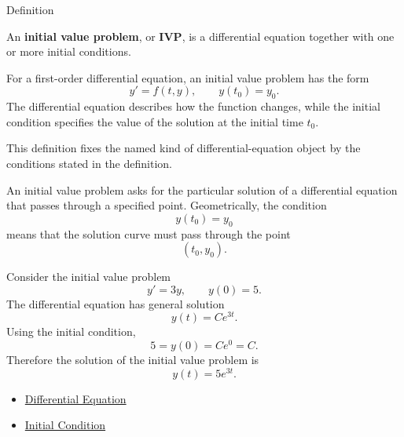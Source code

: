 \begin{definitionbox}{Definition}
\begin{definition}
\label{def:ordinary-differential-equations-solutions-initial-value-problem}
An \textbf{initial value problem}, or \textbf{IVP}, is a differential equation together with one or more initial conditions.

For a first-order differential equation, an initial value problem has the form
\[
y'=f(t,y),
\qquad
y(t_0)=y_0.
\]
The differential equation describes how the function changes, while the initial condition specifies the value of the solution at the initial time $t_0$.
\end{definition}
\end{definitionbox}

\begin{remark*}
This definition fixes the named kind of differential-equation object by the
conditions stated in the definition.
\end{remark*}

\begin{remark*}[Interpretation]
An initial value problem asks for the particular solution of a differential equation that passes through a specified point. Geometrically, the condition
\[
y(t_0)=y_0
\]
means that the solution curve must pass through the point
\[
(t_0,y_0).
\]
\end{remark*}

\begin{remark*}[Examples]
Consider the initial value problem
\[
y'=3y,
\qquad
y(0)=5.
\]
The differential equation has general solution
\[
y(t)=Ce^{3t}.
\]
Using the initial condition,
\[
5=y(0)=Ce^0=C.
\]
Therefore the solution of the initial value problem is
\[
y(t)=5e^{3t}.
\]
\end{remark*}

\begin{dependencies}
\begin{itemize}
  \item \hyperref[def:ordinary-differential-equations-terminology-differential-equation]{Differential Equation}
  \item \hyperref[def:ordinary-differential-equations-solutions-initial-condition]{Initial Condition}
\end{itemize}
\end{dependencies}


